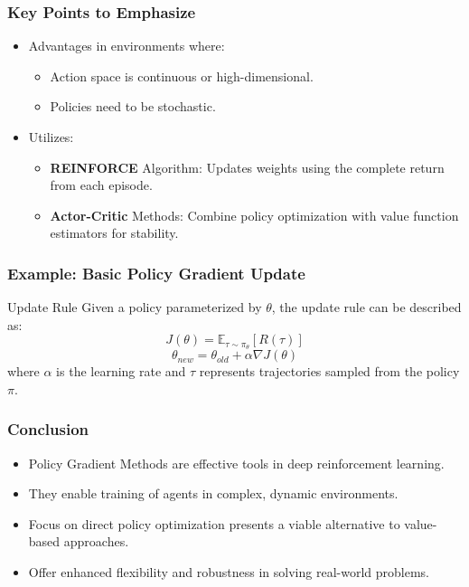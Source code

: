\documentclass[aspectratio=169]{beamer}
\begin{document}
\begin{frame}[fragile]
    \frametitle{Key Points to Emphasize}
    \begin{itemize}
        \item Advantages in environments where:
            \begin{itemize}
                \item Action space is continuous or high-dimensional.
                \item Policies need to be stochastic.
            \end{itemize}
        \item Utilizes:
        \begin{itemize}
            \item \textbf{REINFORCE} Algorithm: Updates weights using the complete return from each episode.
            \item \textbf{Actor-Critic} Methods: Combine policy optimization with value function estimators for stability.
        \end{itemize}
    \end{itemize}
\end{frame}

\begin{frame}[fragile]
    \frametitle{Example: Basic Policy Gradient Update}
    \begin{block}{Update Rule}
        Given a policy parameterized by $\theta$, the update rule can be described as:
        \begin{equation}
            J(\theta) = \mathbb{E}_{\tau \sim \pi_\theta} [R(\tau)]
        \end{equation}
        \begin{equation}
            \theta_{new} = \theta_{old} + \alpha \nabla J(\theta)
        \end{equation}
        where $\alpha$ is the learning rate and $\tau$ represents trajectories sampled from the policy $\pi$.
    \end{block}
\end{frame}

\begin{frame}[fragile]
    \frametitle{Conclusion}
    \begin{itemize}
        \item Policy Gradient Methods are effective tools in deep reinforcement learning.
        \item They enable training of agents in complex, dynamic environments.
        \item Focus on direct policy optimization presents a viable alternative to value-based approaches.
        \item Offer enhanced flexibility and robustness in solving real-world problems.
    \end{itemize}
\end{frame}
\end{document}
